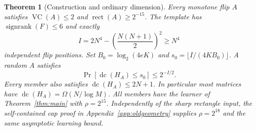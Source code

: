 \documentclass[11pt]{article}
\newtheorem{theorem}{Theorem}
\DeclareMathOperator{\dc}{dc}
\DeclareMathOperator{\sr}{signrank}
\DeclareMathOperator{\rect}{rect}
\newcommand{\1}{\mathbf 1}
\begin{document}
\begin{theorem}[Construction and ordinary dimension]\label{thm:construction}
Every monotone flip $A$ satisfies $\operatorname{VC}(A)\le2$ and $\rect(A)\ge2^{-15}$. The template has $\sr(F)\le6$ and exactly
\begin{equation}\label{eq:I}
 I=2N^4-\left(\frac{N(N+1)}2\right)^2\ge N^4
\end{equation}
independent flip positions. Set $B_0=\log_2(4eK)$ and $s_0=\lfloor I/(4KB_0)\rfloor$. A random $A$ satisfies
\[
 \Pr[\dc(H_A)\le s_0]\le2^{-I/2}.
\]
Every member also satisfies $\dc(H_A)\le2N+1$. In particular most matrices have $\dc(H_A)=\Omega(N/\log M)$. All members have the learner of Theorem~\ref{thm:main} with $\rho=2^{15}$. Independently of the sharp rectangle input, the self-contained cap proof in Appendix~\ref{app:oldgeometry} supplies $\rho=2^{18}$ and the same asymptotic learning bound.
\end{theorem}
\end{document}
